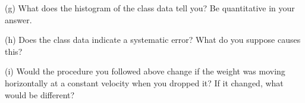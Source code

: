 (g) What does the histogram of the class data tell you? Be quantitative in your answer.                                                      
\vspace{25mm}                                                                                                                                
                                                                                                                                             
(h) Does the class data indicate a systematic error?  What do you suppose causes this?                                                       
\vspace{25mm}                                                                                                                                
                                                                                                                                             
(i) Would the procedure you followed above change if the weight was moving horizontally at a constant velocity when you dropped it? If it changed, what would be different?                                                                                                      
\vspace{20mm}                                                                                                                                



